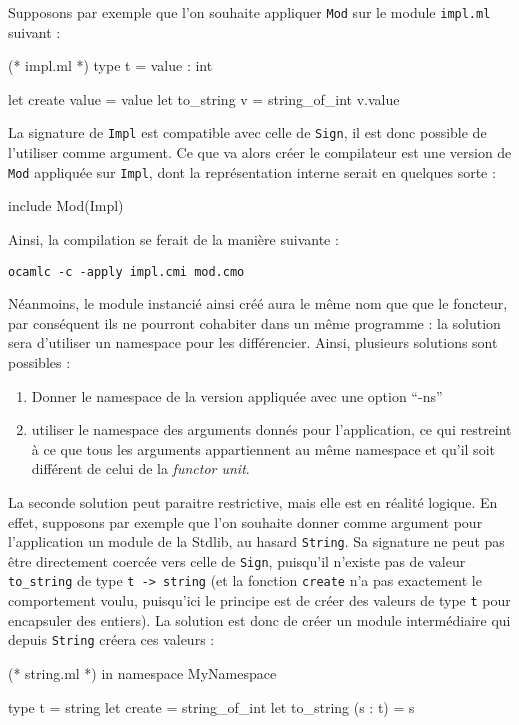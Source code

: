 \documentclass[11pt,a4paper]{report}
\begin{document}
Supposons par exemple que l'on souhaite appliquer \texttt{Mod} sur le module
\texttt{impl.ml} suivant :
\begin{OCaml}
(* impl.ml *)
type t = { value : int }

let create value = { value }
let to_string v = string_of_int v.value
\end{OCaml}

La signature de \texttt{Impl} est compatible avec celle de \texttt{Sign}, il est
donc possible de l'utiliser comme argument. Ce que va alors créer le compilateur
est une version de \texttt{Mod} appliquée sur \texttt{Impl}, dont la
représentation interne serait en quelques sorte :
\begin{OCaml}
include Mod(Impl)
\end{OCaml}

Ainsi, la compilation se ferait de la manière suivante :
\begin{verbatim}
ocamlc -c -apply impl.cmi mod.cmo
\end{verbatim}
Néanmoins, le module instancié ainsi créé aura le même nom que que le foncteur,
par conséquent ils ne pourront cohabiter dans un même programme : la solution
sera d'utiliser un namespace pour les différencier. Ainsi, plusieurs solutions
sont possibles :
\begin{enumerate}
\item Donner le namespace de la version appliquée avec une option ``-ns''
\item utiliser le namespace des arguments donnés pour l'application, ce
  qui restreint à ce que tous les arguments appartiennent au même namespace et
  qu'il soit différent de celui de la \emph{functor unit}.  
\end{enumerate}

La seconde solution peut paraitre restrictive, mais elle est en réalité
logique. En effet, supposons par exemple que l'on souhaite donner comme argument
pour l'application un module de la Stdlib, au hasard \texttt{String}. Sa
signature ne peut pas être directement coercée vers celle de \texttt{Sign},
puisqu'il n'existe pas de valeur \lstinline{to_string} de type 
\lstinline{t -> string} (et la fonction \lstinline{create} n'a pas exactement le
comportement voulu, puisqu'ici le principe est de créer des valeurs de type
\texttt{t} pour encapsuler des entiers). La solution est donc de créer un module
intermédiaire qui depuis \texttt{String} créera ces valeurs :
\begin{OCaml}
(* string.ml *)
in namespace MyNamespace

type t = string
let create = string_of_int
let to_string (s : t) = s
\end{OCaml}
\end{document}
